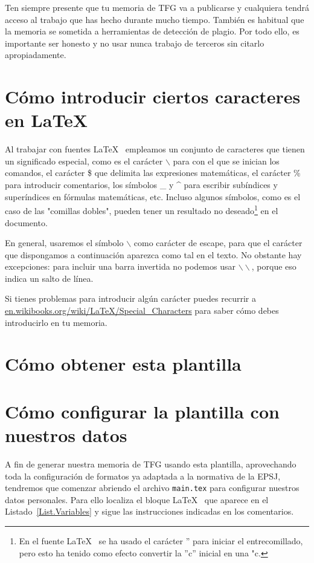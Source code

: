 Ten siempre presente que tu memoria de TFG va a publicarse y cualquiera tendrá acceso al trabajo que has hecho durante mucho tiempo. También es habitual que la memoria se sometida a herramientas de detección de plagio. Por todo ello, es importante ser honesto y no usar nunca trabajo de terceros sin citarlo apropiadamente.

\section{Cómo introducir ciertos caracteres en \LaTeX}

Al trabajar con fuentes \LaTeX~ empleamos un conjunto de caracteres que tienen un significado especial, como es el carácter $\backslash$ para con el que se inician los comandos, el carácter \$ que delimita las expresiones matemáticas, el carácter \% para introducir comentarios, los símbolos \_ y \^{} para escribir subíndices y superíndices en fórmulas matemáticas, etc. Incluso algunos símbolos, como es el caso de las "comillas dobles", pueden tener un resultado no deseado\footnote{En el fuente \LaTeX~ se ha usado el carácter '' para iniciar el entrecomillado, pero esto ha tenido como efecto convertir la ''c'' inicial en una "c.} en el documento.

En general, usaremos el símbolo $\backslash$ como carácter de escape, para que el carácter que dispongamos a continuación aparezca como tal en el texto. No obstante hay excepciones: para incluir una barra invertida no podemos usar $\backslash\backslash$, porque eso indica un salto de línea.

Si tienes problemas para introducir algún carácter puedes recurrir a \url{en.wikibooks.org/wiki/LaTeX/Special_Characters} para saber cómo debes introducirlo en tu memoria.

\section{Cómo obtener esta plantilla}

\section{Cómo configurar la plantilla con nuestros datos}

A fin de generar nuestra memoria de TFG usando esta plantilla, aprovechando toda la configuración de formatos ya adaptada a la normativa de la EPSJ, tendremos que comenzar abriendo el archivo \texttt{main.tex} para configurar nuestros datos personales. Para ello localiza el bloque \LaTeX~ que aparece en el Listado~\ref{List.Variables} y sigue las instrucciones indicadas en los comentarios.


